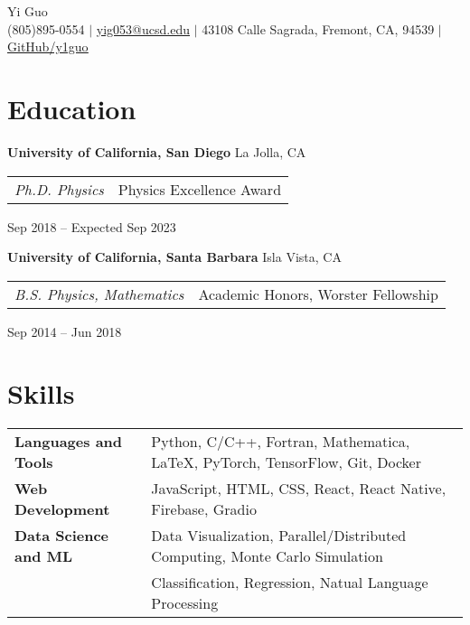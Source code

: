 \documentclass[letterpaper,12pt]{article}
\begin{document}
\newcommand{\name}{Yi Guo}
\newcommand{\phone}{(805)895-0554}
\newcommand{\email}{yig053@ucsd.edu}
\newcommand{\address}{43108 Calle Sagrada, Fremont, CA, 94539}
\newcommand{\github}{y1guo}
\newcommand{\linkedin}{y1guo}
\newcommand{\website}{https://y1guo.github.io}

\begin{center}
    \Huge \name \\
    \vspace{1pt}
    \small \phone 
    $|$ \href{mailto:\email}{\underline{\email}} 
    $|$ \address
    $|$ \href{https://github.com/\github}{\underline{GitHub/\github}} 
    \vspace{-15pt}
\end{center}


\section{Education}

\textbf{University of California, San Diego} \hfill La Jolla, CA \\
\begin{tabular}{p{12em} p{20em}}
    \textit{Ph.D. Physics} 
    & Physics Excellence Award 
\end{tabular}
\hfill Sep 2018 -- Expected Sep 2023

\textbf{University of California, Santa Barbara} \hfill Isla Vista, CA \\
\begin{tabular}{p{12em} p{20em}}
    \textit{B.S. Physics, Mathematics}
    & Academic Honors, Worster Fellowship
\end{tabular}
\hfill Sep 2014 -- Jun 2018


\section{Skills}

\begin{tabular}{p{10em} p{33em}}
    \textbf{Languages and Tools} 
    & Python, C/C++, Fortran, Mathematica, \LaTeX, PyTorch, TensorFlow, Git, Docker \\
    \textbf{Web Development}
    & JavaScript, HTML, CSS, React, React Native, Firebase, Gradio \\
    \textbf{Data Science and ML} 
    & Data Visualization, Parallel/Distributed Computing, Monte Carlo Simulation \\
    & Classification, Regression, Natual Language Processing
\end{tabular}
\end{document}
